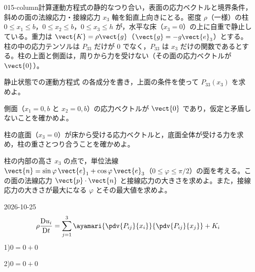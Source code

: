 \documentclass[uplatex,dvipdfmx,a4paper,11pt]{jsarticle}
\begin{document}
\begin{mondai}{015-column}{計算}{運動方程式の静的なつり合い，表面の応力ベクトルと境界条件，斜めの面の法線応力・接線応力}
$x_3$ 軸を鉛直上向きにとる。密度 $\rho$（一様）の柱 $0\le x_1\le b$，$0\le x_2\le b$，$0\le x_3\le h$ が，水平な床（$x_3=0$）の上に自重で静止している。重力は $\vect{K}=\rho\vect{g}$（$\vect{g}=-g\vect{e}_3$）とする。柱の中の応力テンソルは $P_{33}$ だけが $0$ でなく，$P_{33}$ は $x_3$ だけの関数であるとする。柱の上面と側面は，周りから力を受けない（その面の応力ベクトルが $\vect{0}$）。
\begin{shoumon}
  \item 静止状態での運動方程式  の各成分を書き，上面の条件を使って $P_{33}(x_3)$ を求めよ。
  \item 側面（$x_1=0,b$ と $x_2=0,b$）の応力ベクトルが $\vect{0}$ であり，仮定と矛盾しないことを確かめよ。
  \item 柱の底面（$x_3=0$）が床から受ける応力ベクトルと，底面全体が受ける力を求め，柱の重さとつり合うことを確かめよ。
  \item 柱の内部の高さ $x_3$ の点で，単位法線 $\vect{n}=\sin\varphi\,\vect{e}_1+\cos\varphi\,\vect{e}_3$（$0\le\varphi\le\pi/2$）の面を考える。この面の法線応力 $\vect{p}\cdot\vect{n}$ と接線応力の大きさを求めよ。また，接線応力の大きさが最大になる $\varphi$ とその最大値を求めよ。
\end{shoumon}
\begin{kotaeutsushi}{2026-10-25}
\[ \rho\frac{\mathrm{D}u_{i}}{\mathrm{D}t}=\sum_{j=1}^{3}\ayamari{\pdv{P_{ij}}{x_{i}}}{\pdv{P_{ij}}{x_{j}}}+K_{i} \]
1)\enspace $0=0+0$

2)\enspace $0=0+0$


\end{kotaeutsushi}
\end{mondai}
\end{document}
